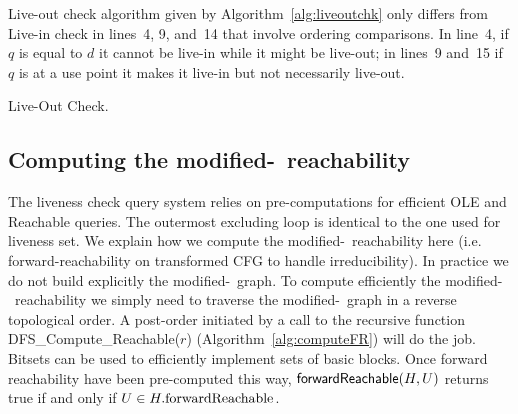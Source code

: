 Live-out check algorithm given by Algorithm~\ref{alg:liveoutchk} only differs from Live-in check in lines~4, 9, and~14 that involve ordering comparisons.
In line~4, if $q$ is equal to $d$ it cannot be live-in while it might be live-out; in lines~9 and~15 if $q$ is at a use point it makes it live-in but not necessarily live-out.

\begin{algorithm}
  \caption{Live-Out Check.}
  \label{alg:liveoutchk}
\end{algorithm}


\subsection{Computing the modified-\reduced\ reachability}

The liveness check query system relies on pre-computations for efficient \textsf{OLE} and \textsf{{\reduced}Reachable} queries.
The outermost excluding loop is identical to the one used for liveness set.
We explain how we compute the modified-\reduced\ reachability here (i.e. forward-reachability on transformed CFG to handle irreducibility).
In practice we do not build explicitly the modified-\reduced\ graph.
To compute efficiently the modified-\reduced\ reachability we simply need to traverse the modified-\reduced\ graph in a reverse topological order.
A post-order initiated by a call to the recursive function \textsf{DFS\_Compute\_{\reduced}Reachable}($r$) (Algorithm~\ref{alg:computeFR}) will do the job.
Bitsets can be used to efficiently implement sets of basic blocks.
Once forward reachability have been pre-computed this way, $\textsf{{forward}Reachable}(H,U)$ returns true if and only if $U\in H.\textrm{{forward}Reachable}$.

